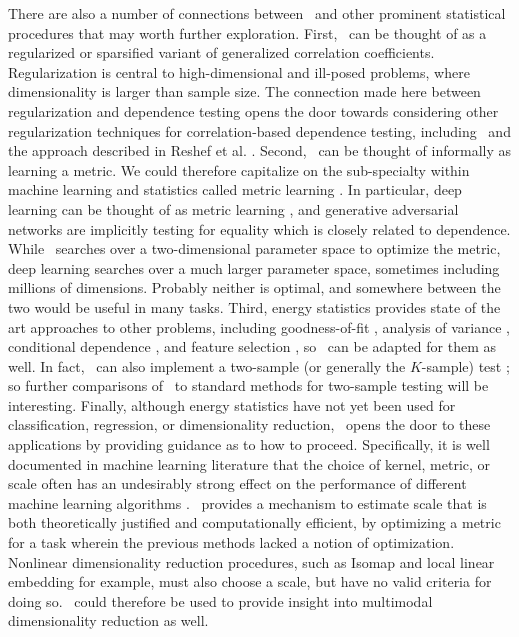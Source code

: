 \documentclass[11pt]{extarticle}
\begin{document}
There are also a number of connections between \Mgc~and other prominent statistical procedures that may worth further exploration. First,  \Mgc~can be thought of as a regularized or sparsified variant of generalized correlation coefficients.  Regularization is central to high-dimensional and ill-posed problems, where dimensionality is larger than sample size. The connection made here between regularization and dependence testing opens the door towards considering other regularization techniques for correlation-based dependence testing, including \Hhg~and the approach described in Reshef et al. \cite{Reshef2011}. Second, \Mgc~can be thought of informally as  learning a metric.  We could therefore capitalize on the sub-specialty within machine learning and statistics called metric learning \cite{xing2003distance}.  In particular, deep learning  can be thought of as metric learning \cite{giryes2015deep}, and generative adversarial networks \cite{goodfellow2014generative} are implicitly testing for equality which is closely related to dependence.
While \Mgc~searches over a two-dimensional parameter space to optimize the metric, deep learning searches over a much larger parameter space, sometimes including millions of dimensions.  Probably neither is optimal, and somewhere between the two would be useful in many tasks.
Third, energy statistics provides state of the art approaches to other problems, including goodness-of-fit \cite{Szekely2005}, analysis of variance \cite{Rizzo2010}, conditional dependence  \cite{Szekely2014,Wang2015}, and feature selection \cite{LiZhongZhu2012,Zhong2015}, so \Mgc~can be adapted for them as well.
In fact, \Mgc~can also implement a two-sample (or generally the $K$-sample) test \cite{Szekely2004, heller2016consistent}; so further comparisons of \Mgc~to standard methods for two-sample testing will be interesting. Finally, although energy statistics have not yet been used for classification, regression, or dimensionality reduction, \Mgc~opens the door to these applications by providing guidance as to how to proceed.
Specifically, it is well documented in machine learning literature that the choice of kernel, metric, or scale often has an undesirably strong effect on the performance of different machine learning algorithms \cite{levina2004maximum}. \Mgc~provides a mechanism to estimate scale that is both theoretically justified and computationally efficient, by optimizing a metric for a task wherein the previous methods lacked a notion of optimization.  Nonlinear dimensionality reduction procedures, such as  Isomap \cite{TenenbaumSilvaLangford2000} and local linear embedding \cite{SaulRoweis2000} for example, must also choose a scale, but have no valid criteria for doing so.  \Mgc~could therefore be used to provide insight into multimodal dimensionality reduction as well.
\end{document}
